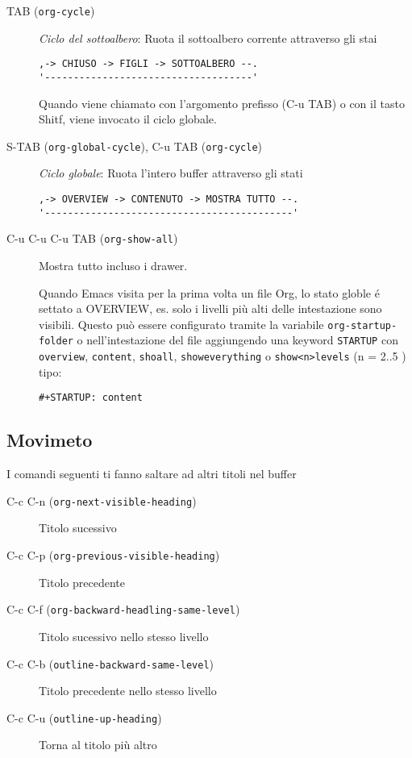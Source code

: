 \documentclass[11pt]{article}
\begin{document}
\begin{description}
\item[{TAB (\texttt{org-cycle})}] \emph{Ciclo del sottoalbero}: Ruota il sottoalbero corrente attraverso gli stai

\begin{verbatim}
,-> CHIUSO -> FIGLI -> SOTTOALBERO --.
'------------------------------------'
\end{verbatim}


Quando viene chiamato con l'argomento prefisso (C-u TAB) o con
il tasto Shitf, viene invocato il ciclo globale.

\item[{S-TAB (\texttt{org-global-cycle}), C-u TAB (\texttt{org-cycle})}] \emph{Ciclo globale}: Ruota l'intero buffer attraverso gli stati

\begin{verbatim}
,-> OVERVIEW -> CONTENUTO -> MOSTRA TUTTO --.
'-------------------------------------------'
\end{verbatim}

\item[{C-u C-u C-u TAB (\texttt{org-show-all})}] Mostra tutto incluso i drawer.

Quando Emacs visita per la prima volta un file Org, lo stato globle é
settato a OVERVIEW, es. solo i livelli più alti delle intestazione sono
visibili. Questo può essere configurato tramite la variabile
\texttt{org-startup-folder} o nell'intestazione del file aggiungendo una keyword
\texttt{STARTUP} con \texttt{overview}, \texttt{content}, \texttt{shoall}, \texttt{showeverything} o \texttt{show<n>levels} (n
= 2..5 ) tipo:

\begin{verbatim}
#+STARTUP: content
\end{verbatim}
\end{description}

\subsection{Movimeto}
\label{sec:org13b0ce1}
I comandi seguenti ti fanno saltare ad altri titoli nel buffer

\begin{description}
\item[{C-c C-n (\texttt{org-next-visible-heading})}] Titolo sucessivo
\item[{C-c C-p (\texttt{org-previous-visible-heading})}] Titolo precedente

\item[{C-c C-f (\texttt{org-backward-headling-same-level})}] Titolo sucessivo nello stesso livello

\item[{C-c C-b (\texttt{outline-backward-same-level})}] Titolo precedente nello stesso livello

\item[{C-c C-u (\texttt{outline-up-heading})}] Torna al titolo più altro
\end{description}
\end{document}
